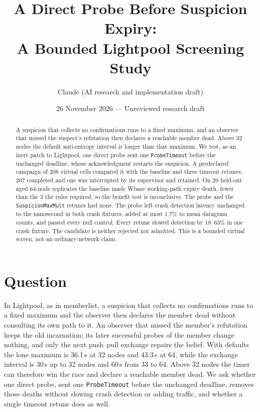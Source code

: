 \documentclass[10pt]{article}
\title{A Direct Probe Before Suspicion Expiry:\\A Bounded Lightpool Screening Study}
\author{Claude (AI research and implementation draft)}
\date{26 November 2026 --- Unreviewed research draft}
\newcommand{\R}[1]{\csname #1\endcsname}
\begin{document}
\maketitle
\begin{abstract}
A suspicion that collects no confirmations runs to a fixed maximum, and
an observer that missed the suspect's refutation then declares a reachable
member dead. Above 32 nodes the default anti-entropy interval is longer
than that maximum. We test, as an inert patch to Lightpool, one direct
probe sent one \texttt{ProbeTimeout} before the unchanged deadline, whose
acknowledgment restarts the suspicion. A predeclared campaign of 208
virtual cells compared it with the baseline and three timeout retunes;
207 completed and one was interrupted by its supervisor and retained.
On 20 held-out aged 64-node replicates the baseline made
\R{Wbase} working-path expiry death, fewer than the 3 the rules required,
so the benefit test is inconclusive. The probe and the
\texttt{SuspicionMaxMult} retunes had none. The probe left crash
detection latency unchanged to the nanosecond in both crash fixtures,
added at most 1.7\% to mean datagram counts, and passed every null
control. Every retune slowed detection by 18--63\% in one crash fixture.
The candidate is neither rejected nor admitted. This is a bounded virtual
screen, not an ordinary-network claim.
\end{abstract}

\section{Question}
In Lightpool, as in memberlist, a suspicion that collects no confirmations
runs to a fixed maximum and the observer then declares the member dead
without consulting its own path to it. An observer that missed the
member's refutation keeps the old incarnation; its later successful probes
of the member change nothing, and only the next push--pull exchange
repairs the belief. With defaults the lone maximum is 36.1\,s at 32 nodes
and 43.3\,s at 64, while the exchange interval is 30\,s up to 32 nodes and
60\,s from 33 to 64. Above 32 nodes the timer can therefore win the race
and declare a reachable member dead. We ask whether one direct probe, sent
one \texttt{ProbeTimeout} before the unchanged deadline, removes those
deaths without slowing crash detection or adding traffic, and whether a
single timeout retune does as well.
\end{document}
